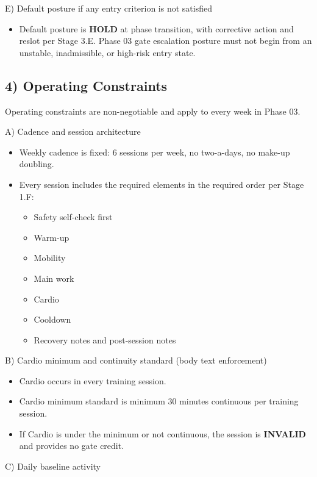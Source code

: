\documentclass[10pt]{article}
\begin{document}
E) Default posture if any entry criterion is not satisfied

\begin{itemize}
\item Default posture is \textbf{HOLD} at phase transition, with corrective action and reslot per Stage 3.E. Phase 03 gate escalation posture must not begin from an unstable, inadmissible, or high-risk entry state.
\end{itemize}

\subsection*{4) Operating Constraints}

Operating constraints are non-negotiable and apply to every week in Phase 03.

A) Cadence and session architecture

\begin{itemize}
\item Weekly cadence is fixed: 6 sessions per week, no two-a-days, no make-up doubling.
\item Every session includes the required elements in the required order per Stage 1.F:
  \begin{itemize}
  \item Safety self-check first
  \item Warm-up
  \item Mobility
  \item Main work
  \item Cardio
  \item Cooldown
  \item Recovery notes and post-session notes
  \end{itemize}
\end{itemize}

B) Cardio minimum and continuity standard (body text enforcement)

\begin{itemize}
\item Cardio occurs in every training session.
\item Cardio minimum standard is minimum 30 minutes continuous per training session.
\item If Cardio is under the minimum or not continuous, the session is \textbf{INVALID} and provides no gate credit.
\end{itemize}

C) Daily baseline activity
\end{document}
